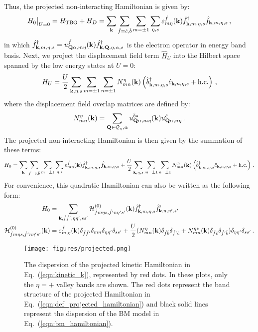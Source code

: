\documentclass[prb,aps,nofootinbib,amssymb,twocolumn,superscriptaddress,10pt]{revtex4-2}
\begin{document}
\begin{widetext}
Thus, the projected non-interacting Hamiltonian is given by:
\begin{equation}
	H_0 \big{|}_{U=0} = H_{\rm TBG} + H_{D} = \sum_{\mathbf{k}}\sum_{\hat{f}=\hat{c},\hat{b}}\sum_{m=\pm1 }\sum_{\eta, s}\varepsilon_{m\eta}^{\hat{f}}(\mathbf{k}) \hat{f}^\dagger_{\mathbf{k},m,\eta,s} \hat{f}_{\mathbf{k}, m, \eta, s}\,,
\end{equation}
in which $\hat{f}^\dagger_{\mathbf{k}, m,\eta, s} = u^{\hat{f}}_{\mathbf{Q}\alpha, m\eta}(\mathbf{k})\hat{f}^\dagger_{\mathbf{k},\mathbf{Q},\eta, \alpha, s}$ is the electron operator in energy band basis. Next, we project the displacement field term $\hat{H}_U$ into the Hilbert space spanned by the low energy states at $U=0$:
\begin{equation}
	H_U = \frac{U}{2}\sum_{\mathbf{k}, \eta, s}\sum_{m=\pm1}\sum_{n=\pm1}N^\eta_{mn}(\mathbf{k})\left(\hat{b}^\dagger_{\mathbf{k}, m, \eta, s}\hat{c}_{\mathbf{k}, n, \eta, s} + {\rm h.c.}\right)\,,
\end{equation}
where the displacement field overlap matrices are defined by:
\begin{equation}
	N^{\eta}_{mn}(\mathbf{k}) = \sum_{\mathbf{Q}\in\mathcal{Q}_\eta, \alpha} u^{\hat{b}*}_{\mathbf{Q}\alpha, m\eta}(\mathbf{k})u^{\hat{c}}_{\mathbf{Q}\alpha, n\eta}\,.
\end{equation}
The projected non-interacting Hamiltonian is then given by the summation of these terms:
\begin{equation}\label{eqn:def_projected_hamiltonian}
	H_0 = \sum_{\mathbf{k}}\sum_{\hat{f}=\hat{c},\hat{b}}\sum_{m=\pm1 }\sum_{\eta, s}\varepsilon_{m\eta}^{\hat{f}}(\mathbf{k}) \hat{f}^\dagger_{\mathbf{k},m,\eta,s} \hat{f}_{\mathbf{k}, m, \eta, s} + \frac{U}{2}\sum_{\mathbf{k}, \eta, s}\sum_{m=\pm1}\sum_{n=\pm1}N^\eta_{mn}(\mathbf{k})\left(\hat{b}^\dagger_{\mathbf{k}, m, \eta, s}\hat{c}_{\mathbf{k}, n, \eta, s} + {\rm h.c.}\right)\,.
\end{equation}
For convenience, this quadratic Hamiltonian can also be written as the following form:
\begin{align}
	H_0 &= \sum_{\mathbf{k},\hat{f}\hat{f}',\eta\eta',ss'}\mathcal{H}^{(0)}_{\hat{f}m\eta s,\hat{f}'n\eta's'}(\mathbf{k})\hat{f}^\dagger_{\mathbf{k},m,\eta,s}\hat{f}'_{\mathbf{k},n,\eta',s'}\\
	\mathcal{H}^{(0)}_{\hat{f}m\eta s,\hat{f}'n\eta's'}(\mathbf{k}) &= \varepsilon_{m,\eta}^{\hat{f}}(\mathbf{k}) \delta_{\hat{f}\hat{f}'}\delta_{mn}\delta_{\eta\eta'}\delta_{ss'} + \frac{U}{2}(N^{\eta}_{mn}(\mathbf{k})\delta_{\hat{f}\hat{b}}\delta_{\hat{f}'\hat{c}} + N^{\eta*}_{mn}(\mathbf{k})\delta_{\hat{f}\hat{c}}\delta_{\hat{f}'\hat{b}})\delta_{\eta\eta'}\delta_{ss'}\,.\label{eqn:kinetic_k}
\end{align}

\begin{figure}[!htbp]
    \centering
    \texttt{[image: figures/projected.png]}
    \caption{The dispersion of the projected kinetic Hamiltonian in Eq.~(\ref{eqn:kinetic_k}), represented by red dots. In these plots, only the $\eta = +$ valley bands are shown. The red dots represent the band structure of the projected Hamiltonian in Eq.~(\ref{eqn:def_projected_hamiltonian}) and black solid lines represent the dispersion of the BM model in Eq.~(\ref{eqn:bm_hamiltonian}).}
    \label{fig:projected}
\end{figure}


\end{widetext}
\end{document}
